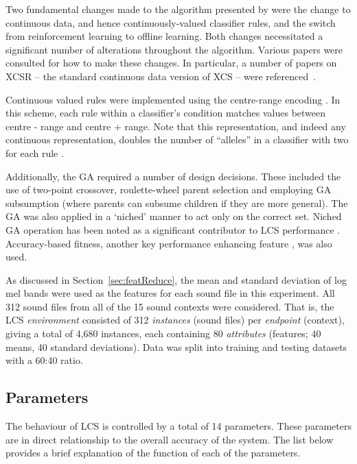 \documentclass[11pt]{article}
\begin{document}
Two fundamental changes made to the algorithm presented by \citeauthor{Butz2000} were the change to continuous data, and hence continuously-valued classifier rules, and the switch from reinforcement learning to offline learning. Both changes necessitated a significant number of alterations throughout the algorithm. Various papers were consulted for how to make these changes. In particular, a number of papers on XCSR -- the standard continuous data version of XCS -- were referenced~\cite{Sowden2007,Stone2003,Wilson2000,Behdad2012}.

Continuous valued rules were implemented using the centre-range encoding \cite{Sowden2007}. In this scheme, each rule within a classifier's condition matches values between centre - range and centre + range. Note that this representation, and indeed any continuous representation, doubles the number of ``alleles'' in a classifier with two for each rule \cite{Sowden2007}.

Additionally, the GA required a number of design decisions. These included the use of two-point crossover, roulette-wheel parent selection and employing GA subsumption (where parents can subsume children if they are more general). The GA was also applied in a `niched' manner to act only on the correct set. Niched GA operation has been noted as a significant contributor to LCS performance \cite{Lanzi2008}. Accuracy-based fitness, another key performance enhancing feature \cite{Lanzi2008}, was also used.

As discussed in Section~\ref{sec:featReduce}, the mean and standard deviation of log mel bands were used as the features for each sound file in this experiment. All 312 sound files from all of the 15 sound contexts were considered. That is, the LCS \textit{environment} consisted of 312 \textit{instances} (sound files) per \textit{endpoint} (context), giving a total of 4,680 instances, each containing 80 \textit{attributes} (features; 40 means, 40 standard deviations). Data was split into training and testing datasets with a 60:40 ratio.







\subsection{Parameters}
\label{sec:exp2params}

The behaviour of LCS is controlled by a total of 14 parameters. These parameters are in direct relationship to the overall accuracy of the system. The list below provides a brief explanation of the function of each of the parameters.
\end{document}
